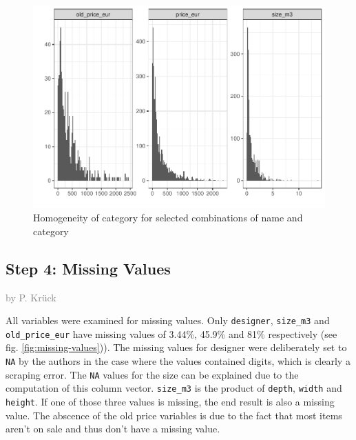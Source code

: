\documentclass[a4paper, nobind]{templates/ociamthesis}
\begin{document}
\begin{figure}
\includegraphics[width=1\linewidth]{_main_files/figure-latex/normality-1} \caption{Homogeneity of category for selected combinations of name and category}\label{fig:normality}
\end{figure}

\hypertarget{step-4-missing-values}{%
\subsection{Step 4: Missing Values}\label{step-4-missing-values}}

\textcolor{gray}{by P. Krück}

All variables were examined for missing values. Only \texttt{designer}, \texttt{size\_m3} and \texttt{old\_price\_eur} have missing values of 3.44\%, 45.9\% and 81\% respectively (see fig. \ref{fig:missing-values})).
The missing values for designer were deliberately set to \texttt{NA} by the authors in the case where the values contained digits, which is clearly a scraping error.
The \texttt{NA} values for the size can be explained due to the computation of this column vector. \texttt{size\_m3} is the product of \texttt{depth}, \texttt{width} and \texttt{height}. If one of those three values is missing, the end result is also a missing value.
The abscence of the old price variables is due to the fact that most items aren't on sale and thus don't have a missing value.
\end{document}
